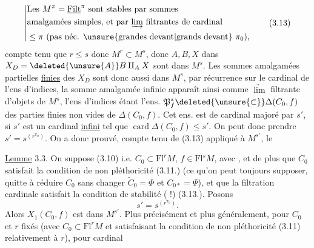 
\[
\left|\begin{aligned}
&\text{Les }M^\pi=\underline{\mathrm{Filt}}^\pi\text{ sont stables par sommes}\\
&\text{amalgamées simples, et par }\underrightarrow{\lim}\text{ filtrantes de cardinal}\\
&\leq\pi\text{ (pas néc. } \unsure{\text{grandes devant}|\text{grands devant}}\ \pi_0),
\end{aligned}\right.
\tag*{(3.13)}
\]
compte tenu que $r\leq s$ donc $M^r\subset M^s$, donc
$A,B,X$ dans $X_D=\deleted{\unsure{A}}B\amalg_A X$ sont dans $M^s$. Les sommes
amalgamées partielles \uline{finies} des $X_D$ sont
donc aussi dans $M^s$, par récurrence sur le
cardinal de l'ens d'indices,  la somme
amalgamée infinie apparaît ainsi comme
$\underrightarrow{\lim}$ filtrante d'objets de $M^s$, l'ens d'indices
étant l'ens. $\mathfrak P_f^*\deleted{\unsure{\subset}}\Delta(C_0,f)$ des parties finies
non vides de $\Delta(C_0,f)$. Cet ens. est de
cardinal majoré par  $s'$,  si $s'$ est un cardinal \uline{infini} tel que
$\operatorname{card}\Delta(C_0,f)\leq s'$. On peut donc prendre $s'=s^{(r^{\pi_0})}$.
On a donc prouvé, compte tenu de (3.13)
appliqué à $M^{s'}$, le

\uline{Lemme} 3.3. On suppose (3.10) i.e. $C_0\subset\mathrm{Fl}^rM$,
$f\in\mathrm{Fl}^sM$, avec  ,
et de plus que $C_0$ satisfait la condition de non pléthoricité (3.11.)
(ce qu'on peut toujours supposer, quitte à réduire
$C_0$ sans changer $\widetilde C_0=\Phi$  et $C_{0*}=\Psi$), et
que la filtration cardinale satisfait la condition
de stabilité ( !) (3.13.). Posons
\[
s'=s^{(r^{\pi_0})}.
\]
Alors $X_1(C_0,f)$ est dans $M^{s'}$. Plus précisément et
plus généralement, pour $C_0$ et $r$ fixés (avec $C_0\subset\mathrm{Fl}^rM$
et satisfaisant la condition de non pléthoricité
(3.11) relativement à $r$), pour  cardinal
